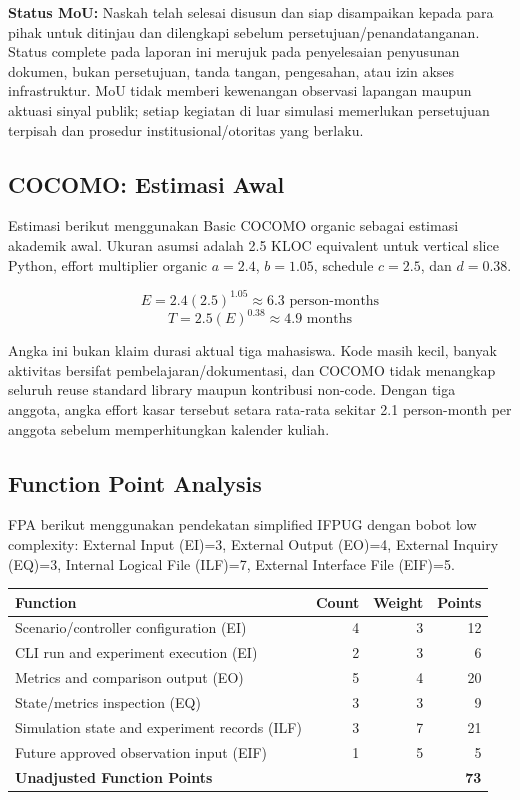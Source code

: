 \documentclass[12pt]{article}
\begin{document}
\textbf{Status MoU:} Naskah telah selesai disusun dan siap disampaikan kepada para pihak untuk ditinjau dan dilengkapi sebelum persetujuan/penandatanganan. Status complete pada laporan ini merujuk pada penyelesaian penyusunan dokumen, bukan persetujuan, tanda tangan, pengesahan, atau izin akses infrastruktur. MoU tidak memberi kewenangan observasi lapangan maupun aktuasi sinyal publik; setiap kegiatan di luar simulasi memerlukan persetujuan terpisah dan prosedur institusional/otoritas yang berlaku.

\subsection{COCOMO: Estimasi Awal}
Estimasi berikut menggunakan Basic COCOMO organic sebagai estimasi akademik awal. Ukuran asumsi adalah 2.5 KLOC equivalent untuk vertical slice Python, effort multiplier organic \(a=2.4\), \(b=1.05\), schedule \(c=2.5\), dan \(d=0.38\).

\[
E = 2.4(2.5)^{1.05} \approx 6.3\text{ person-months}
\]
\[
T = 2.5(E)^{0.38} \approx 4.9\text{ months}
\]

Angka ini bukan klaim durasi aktual tiga mahasiswa. Kode masih kecil, banyak aktivitas bersifat pembelajaran/dokumentasi, dan COCOMO tidak menangkap seluruh reuse standard library maupun kontribusi non-code. Dengan tiga anggota, angka effort kasar tersebut setara rata-rata sekitar 2.1 person-month per anggota sebelum memperhitungkan kalender kuliah.

\subsection{Function Point Analysis}
FPA berikut menggunakan pendekatan simplified IFPUG dengan bobot low complexity: External Input (EI)=3, External Output (EO)=4, External Inquiry (EQ)=3, Internal Logical File (ILF)=7, External Interface File (EIF)=5.

\begin{longtable}{p{} r r r}
\toprule
\textbf{Function} & \textbf{Count} & \textbf{Weight} & \textbf{Points}\\
\midrule
Scenario/controller configuration (EI) & 4 & 3 & 12\\
CLI run and experiment execution (EI) & 2 & 3 & 6\\
Metrics and comparison output (EO) & 5 & 4 & 20\\
State/metrics inspection (EQ) & 3 & 3 & 9\\
Simulation state and experiment records (ILF) & 3 & 7 & 21\\
Future approved observation input (EIF) & 1 & 5 & 5\\
\midrule
\textbf{Unadjusted Function Points} & & & \textbf{73}\\
\bottomrule
\end{longtable}
\end{document}

